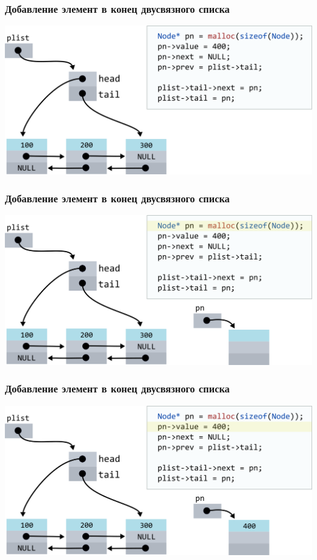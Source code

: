 \documentclass[10pt,pdf,hyperref={unicode}]{beamer}
\begin{document}
\begin{frame}[fragile]
\frametitle{Добавление элемент в конец двусвязного списка}
\begin{center}
\includegraphics[width=\imageSizeMult\linewidth]{../images/doublylist/doublylist_addlast1.png}
\end{center}
\end{frame}

\begin{frame}[fragile]
\frametitle{Добавление элемент в конец двусвязного списка}
\begin{center}
\includegraphics[width=\imageSizeMult\linewidth]{../images/doublylist/doublylist_addlast2.png}
\end{center}
\end{frame}

\begin{frame}[fragile]
\frametitle{Добавление элемент в конец двусвязного списка}
\begin{center}
\includegraphics[width=\imageSizeMult\linewidth]{../images/doublylist/doublylist_addlast3.png}
\end{center}
\end{frame}
\end{document}
